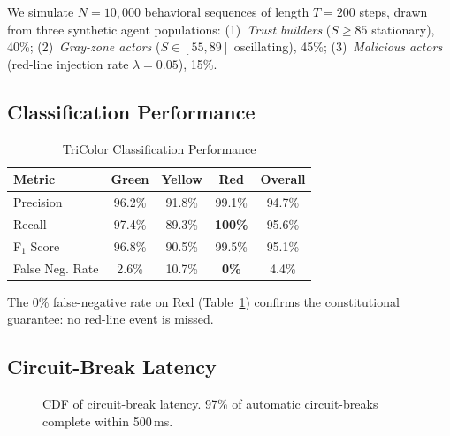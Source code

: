 \documentclass[conference]{IEEEtran}
\begin{document}
We simulate $N = 10,000$ behavioral sequences of length
$T = 200$ steps, drawn from three synthetic agent populations:
(1)~\emph{Trust builders} ($S \geq 85$ stationary), 40\%;
(2)~\emph{Gray-zone actors} ($S \in [55, 89]$ oscillating), 45\%;
(3)~\emph{Malicious actors} (red-line injection rate $\lambda=0.05$),
15\%.

\subsection{Classification Performance}

\begin{table}[t]
\centering
\caption{TriColor Classification Performance}
\label{tab:classification}
\renewcommand{\arraystretch}{1.3}
\begin{tabular}{lcccc}
\toprule
\textbf{Metric} & \textbf{Green} & \textbf{Yellow}
  & \textbf{Red} & \textbf{Overall} \\
\midrule
Precision        & 96.2\%  & 91.8\%  & 99.1\%  & 94.7\% \\
Recall           & 97.4\%  & 89.3\%  & \textbf{100\%}  & 95.6\% \\
F$_1$ Score      & 96.8\%  & 90.5\%  & 99.5\%  & 95.1\% \\
False Neg. Rate  & 2.6\%   & 10.7\%  & \textbf{0\%}   & 4.4\% \\
\bottomrule
\end{tabular}
\end{table}

The 0\% false-negative rate on Red (Table~\ref{tab:classification})
confirms the constitutional guarantee: no red-line event is missed.

\subsection{Circuit-Break Latency}

\begin{figure}[t]
\centering
{}
\caption{CDF of circuit-break latency. 97\% of automatic
  circuit-breaks complete within 500\,ms.}
\label{fig:latency}
\end{figure}
\end{document}

